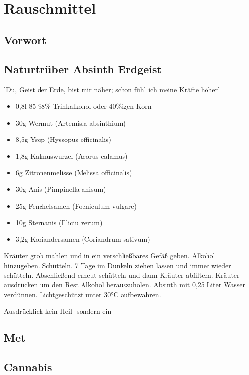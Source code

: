 \chapter{Rauschmittel}

\section{Vorwort}

\lipsum[1-5]
\newpage


\section{Naturtrüber Absinth Erdgeist}

'Du, Geist der Erde, bist mir näher; schon fühl ich meine Kräfte höher'

\begin{itemize}
	\item 0,8l 85-98\% Trinkalkohol oder 40\%igen Korn
	\item 30g Wermut (Artemisia absinthium)
	\item 8,5g Ysop (Hyssopus officinalis)
	\item 1,8g Kalmuswurzel (Acorus calamus)
	\item 6g Zitronenmelisse (Melissa officinalis)
	\item 30g Anis (Pimpinella anisum)
	\item 25g Fenchelsamen (Foeniculum vulgare)
	\item 10g Sternanis (Illiciu verum)
	\item 3,2g Koriandersamen (Coriandrum sativum)
\end{itemize}

Kräuter grob mahlen und in ein verschließbares Gefäß geben.
Alkohol hinzugeben.
Schütteln.
7 Tage im Dunkeln ziehen lassen und immer wieder schütteln.
Abschließend erneut schütteln und dann Kräuter abfiltern.
Kräuter ausdrücken um den Rest Alkohol herauszuholen.
Absinth mit 0,25 Liter Wasser verdünnen.
Lichtgeschützt unter 30°C aufbewahren.


Ausdrücklich kein Heil- sondern ein 


\section{Met}

\section{Cannabis}

